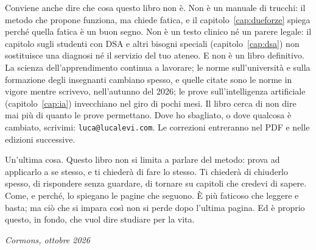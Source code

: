Conviene anche dire che cosa questo libro non è. Non è un manuale di
trucchi: il metodo che propone funziona, ma chiede fatica, e il
capitolo~\ref{cap:dueforze} spiega perché quella fatica è un buon
segno. Non è un testo clinico né un parere legale: il capitolo sugli
studenti con DSA e altri bisogni speciali
(capitolo~\ref{cap:dsa}) non sostituisce una diagnosi né il servizio
del tuo ateneo. E non è un libro definitivo. La scienza
dell'apprendimento continua a lavorare; le norme sull'università e
sulla formazione degli insegnanti cambiano spesso, e quelle citate sono
le norme in vigore mentre scrivevo, nell'autunno del 2026; le prove
sull'intelligenza artificiale (capitolo~\ref{cap:ia}) invecchiano nel
giro di pochi mesi. Il libro cerca di non dire mai più di quanto le
prove permettano. Dove ho sbagliato, o dove qualcosa è cambiato, scrivimi:
\texttt{luca@lucalevi.com}. Le correzioni entreranno nel PDF e nelle
edizioni successive.

Un'ultima cosa. Questo libro non si limita a parlare del metodo: prova
ad applicarlo a se stesso, e ti chiederà di fare lo stesso. Ti chiederà
di chiuderlo spesso, di rispondere senza guardare, di tornare su
capitoli che credevi di sapere. Come, e perché, lo spiegano le pagine
che seguono. È più faticoso che leggere e basta; ma ciò che si impara
così non si perde dopo l'ultima pagina. Ed è proprio questo, in fondo,
che vuol dire studiare per la vita.

\begin{flushright}
  \itshape Cormons, ottobre 2026
\end{flushright}

\finecapitolo

